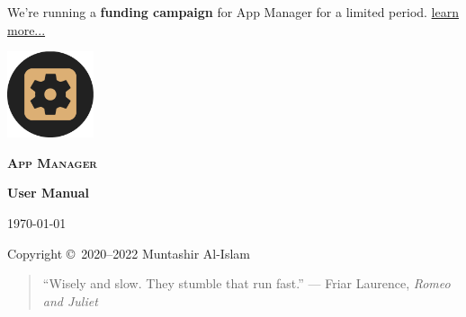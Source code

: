 \begin{titlingpage}
    \pagecolor{SunTan}
    \begin{center}
        \begin{announcement}
        We're running a \textbf{funding campaign} for App Manager for a limited period. \href{https://opencollective.com/app-manager#category-ABOUT}{learn more...}
        \par\vspace{1cm}
        \end{announcement}
        \includegraphics[width=1in]{../images/icon}\par\vspace{1cm}
        {\Huge\textbf{\textsc{App Manager}}\par}
        \vspace{2.5cm}
        {\huge\bfseries User Manual\par}
        \vspace{.5cm}
        {\Large\itshape\version\par}
        \vfill
        {\large\today\par}
        \vfill
        {Copyright \copyright\ 2020--2022 Muntashir Al-Islam\par}
        \pagebreak
        \pagecolor{white}
        \begin{quotation}
            ``Wisely and slow. They stumble that run fast.''
                {--- Friar Laurence, \textit{Romeo and Juliet}}
        \end{quotation}
    \end{center}
\end{titlingpage}
